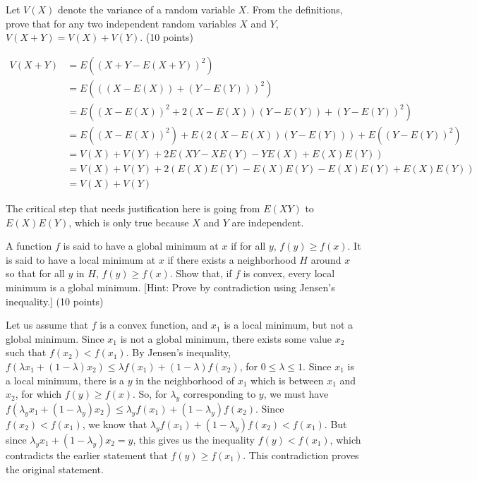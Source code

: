 \documentclass[fleqn]{homework}
\begin{document}
  \maketitle

  \begin{problem}{1}
    \begin{question}
      Let $V(X)$ denote the variance of a random variable $X$.  From the
      definitions, prove that for any two independent random variables $X$ and
      $Y$, $V(X + Y) = V(X) + V(Y)$. (10 points)
    \end{question}

    \begin{align*}
      V(X + Y) &= E((X+Y-E(X+Y))^2) \\
               &= E(((X-E(X)) + (Y-E(Y)))^2) \\
               &= E((X-E(X))^2 + 2(X-E(X))(Y-E(Y)) + (Y-E(Y))^2) \\
               &= E((X-E(X))^2) + E(2(X-E(X))(Y-E(Y))) + E((Y-E(Y))^2) \\
               &= V(X) + V(Y) + 2E(XY - XE(Y) - YE(X) + E(X)E(Y)) \\
               &= V(X) + V(Y) + 2(E(X)E(Y) - E(X)E(Y) - E(X)E(Y) + E(X)E(Y)) \\
               &= V(X) + V(Y)
    \end{align*}

    The critical step that needs justification here is going from $E(XY)$ to
    $E(X)E(Y)$, which is only true because $X$ and $Y$ are independent.
  \end{problem}

  \begin{problem}{2}
    \begin{question}
      A function $f$ is said to have a global minimum at $x$ if for all $y$,
      $f(y) \ge f(x)$.  It is said to have a local minimum at $x$ if there
      exists a neighborhood $H$ around $x$ so that for all $y$ in $H$,
      $f(y) \ge f(x)$.  Show that, if $f$ is convex, every local minimum is a
      global minimum.  [Hint: Prove by contradiction using Jensen's inequality.]
      (10 points)
    \end{question}

    Let us assume that $f$ is a convex function, and $x_1$ is a local minimum,
    but not a global minimum.  Since $x_1$ is not a global minimum, there exists
    some value $x_2$ such that $f(x_2) < f(x_1)$.  By Jensen's inequality,
    $f(\lambda x_1 + (1-\lambda) x_2) \le \lambda f(x_1) + (1-\lambda) f(x_2)$,
    for $0 \le \lambda \le 1$.  Since $x_1$ is a local minimum, there is a $y$
    in the neighborhood of $x_1$ which is between $x_1$ and $x_2$, for which
    $f(y) \ge f(x)$.  So, for $\lambda_y$ corresponding to $y$, we must have
    $f(\lambda_y x_1 + (1-\lambda_y) x_2) \le \lambda_y f(x_1) + (1-\lambda_y)
    f(x_2)$.
    Since $f(x_2) < f(x_1)$, we know that
    $\lambda_y f(x_1) + (1-\lambda_y) f(x_2) < f(x_1)$.  But since
    $\lambda_y x_1 + (1-\lambda_y) x_2 = y$, this gives us the inequality
    $f(y) < f(x_1)$, which contradicts the earlier statement that
    $f(y) \ge f(x_1)$.  This contradiction proves the original statement.
  \end{problem}
\end{document}
